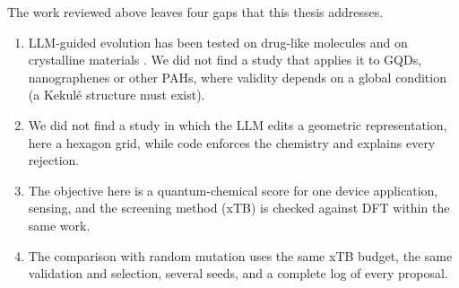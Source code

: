 The work reviewed above leaves four gaps that this thesis addresses.
\begin{enumerate}
  \item LLM-guided evolution has been tested on drug-like molecules
        \cite{wang2024molleo,ojeda2026harness} and on crystalline materials
        \cite{gan2025matllmsearch,abhyankar2026llema}. We did not find a study that applies it to
        GQDs, nanographenes or other PAHs, where validity depends on a global condition (a
        Kekul\'e structure must exist).
  \item We did not find a study in which the LLM edits a geometric representation, here a hexagon
        grid, while code enforces the chemistry and explains every rejection.
  \item The objective here is a quantum-chemical score for one device application, 
        sensing, and the screening method (xTB) is checked against DFT within the same work.
  \item The comparison with random mutation uses the same xTB budget, the same validation and
        selection, several seeds, and a complete log of every proposal.
\end{enumerate}
